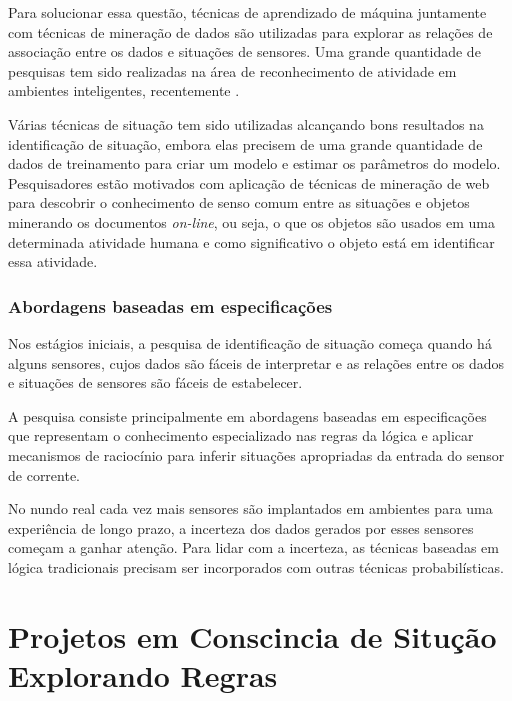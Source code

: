 \documentclass[12pt,a4paper,compsoc]{IEEEtran}
\begin{document}
  Para solucionar essa questão, técnicas de aprendizado de máquina juntamente com técnicas de
  mineração de dados são utilizadas para explorar as relações de associação entre os dados e 
  situações de sensores. Uma grande quantidade de pesquisas tem sido realizadas na área de
  reconhecimento de atividade em ambientes inteligentes, recentemente \cite{knappmeyer2012survey}.
  
  Várias técnicas de situação tem sido utilizadas alcançando bons resultados na identificação de
  situação, embora elas precisem de uma grande quantidade de dados de treinamento para criar um
  modelo e estimar os parâmetros do modelo. Pesquisadores estão motivados com aplicação de técnicas
  de mineração de web para descobrir o conhecimento de senso comum entre as situações e objetos
  minerando os documentos \textit{on-line}, ou seja, o que os objetos são usados em uma determinada 
  atividade humana e como significativo o objeto está em identificar essa atividade.


\subsubsection{Abordagens baseadas em especificações}

  Nos estágios iniciais, a pesquisa de identificação de situação começa quando há alguns sensores,
  cujos dados são fáceis de interpretar e as relações entre os dados e situações de sensores são 
  fáceis de estabelecer.
  
  A pesquisa consiste principalmente em abordagens baseadas em especificações que representam o
  conhecimento especializado nas regras da lógica e aplicar mecanismos de raciocínio para inferir
  situações apropriadas da entrada do sensor de corrente.
  
  No nundo real cada vez mais sensores são implantados em ambientes para uma experiência de longo
  prazo, a incerteza dos dados gerados por esses sensores  começam a ganhar atenção. Para lidar com
  a incerteza, as técnicas baseadas em lógica tradicionais precisam ser incorporados com outras
  técnicas probabilísticas.


\section{Projetos em Conscincia de Situção Explorando Regras}
\end{document}
